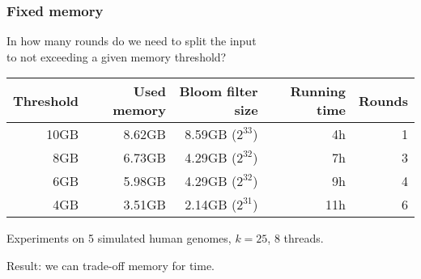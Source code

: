 
\begin{frame}
	\frametitle{Fixed memory}
	\centering
	
	In how many rounds do we need to split the input\\ to not exceeding a given memory threshold?
	
	\bigskip
	
	\begin{tabular}{ | r | r | r | r | r | }
  \hline
  Threshold  & Used memory & Bloom filter size & Running time & Rounds \\ \hline
        10GB &      8.62GB &       8.59GB ($2^{33}$) &           4h &      1 \\
         8GB &      6.73GB &       4.29GB ($2^{32}$) &           7h &      3 \\
         6GB &      5.98GB &       4.29GB ($2^{32}$) &           9h &      4 \\
         4GB &      3.51GB &       2.14GB ($2^{31}$) &          11h &      6 \\
  \hline
  \end{tabular}
  
  \medskip
  
  Experiments on 5 simulated human genomes, $k = 25$, 8 threads.
  
  \medskip
  
  Result: we can trade-off memory for time.
  

\end{frame}


%	
%	 
%	

